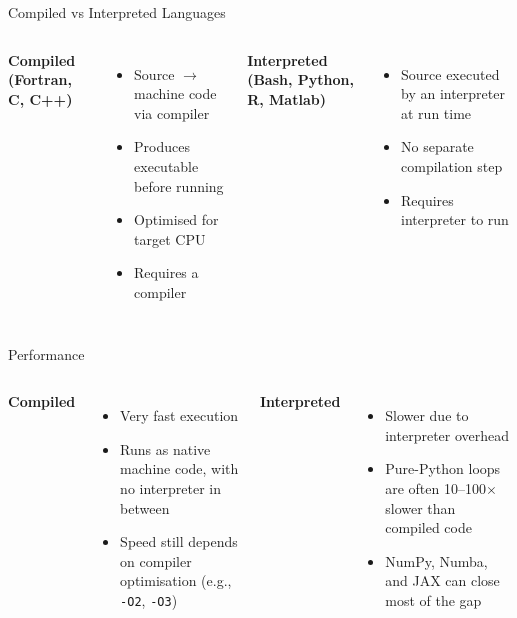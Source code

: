 \begin{frame}{Compiled vs Interpreted Languages}
	\begin{columns}[T]
		\textbf{Compiled (Fortran, C, C++)}
		\begin{itemize}
			\item Source $\to$ machine code via compiler
			\item Produces executable before running
			\item Optimised for target CPU
			\item Requires a compiler
		\end{itemize}

		\textbf{Interpreted (Bash, Python, R, Matlab)}
		\begin{itemize}
			\item Source executed by an interpreter at run time
			\item No separate compilation step
			\item Requires interpreter to run
		\end{itemize}
	\end{columns}
\end{frame}


\begin{frame}{Performance}
	\begin{columns}[T]
		\textbf{Compiled}
		\begin{itemize}
			\item Very fast execution
			\item Runs as native machine code, with no interpreter in between
			\item Speed still depends on compiler optimisation (e.g., \texttt{-O2}, \texttt{-O3})
		\end{itemize}

		\textbf{Interpreted}
		\begin{itemize}
			\item Slower due to interpreter overhead
			\item Pure-Python loops are often 10--100$\times$ slower than compiled code
			\item NumPy, Numba, and JAX can close most of the gap
		\end{itemize}
	\end{columns}
\end{frame}



